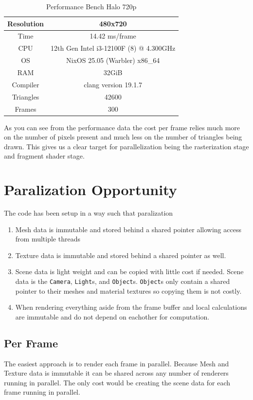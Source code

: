 \documentclass[12pt]{article}
\begin{document}
\begin{table}[H]
	\caption{Performance Bench Halo 720p}
	\centering
	\begin{tabular}{|c|c|}
		\hline
		Resolution& 480x720\\\hline
		Time& 14.42 ms/frame\\\hline
		CPU&12th Gen Intel i3-12100F (8) @ 4.300GHz\\\hline
		OS&NixOS 25.05 (Warbler) x86\_64\\\hline
		RAM&32GiB\\\hline
		Compiler&clang version 19.1.7\\\hline
		Triangles&42600\\\hline
		Frames&300\\\hline
	\end{tabular}
	\label{table:performance-720-halo}
\end{table}

As you can see from the performance data the cost per frame relies much more on the number of pixels present and much less on the number of triangles being drawn. This gives us a clear target for parallelization being the rasterization stage and fragment shader stage.


\section{Paralization Opportunity}
The code has been setup in a way such that paralization 

\begin{enumerate}
	\item Mesh data is immutable and stored behind a shared pointer allowing access from multiple threads
	\item Texture data is immutable and stored behind a shared pointer as well.
	\item Scene data is light weight and can be copied with little cost if needed.
	\subitem Scene data is the \texttt{Camera}, \texttt{Light}s, and \texttt{Object}s.
	\subitem \texttt{Object}s only contain a shared pointer to their meshes and material textures so copying them is not costly.
	\item When rendering everything aside from the frame buffer and local calculations are immutable and do not depend on eachother for computation.
\end{enumerate}

\subsection{Per Frame}
The easiest approach is to render each frame in parallel. Because Mesh and Texture data is immutable it can be shared across any number of renderers running in parallel. The only cost would be creating the scene data for each frame running in parallel.
\end{document}
